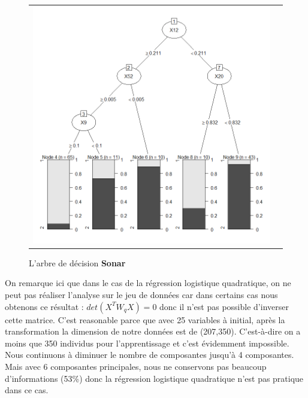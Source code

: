 \documentclass[a4paper,11pt,oneside,roman]{article}
\begin{document}
\begin{figure}[htb]
    \centering
    \begin{tabular}{cc}
    \includegraphics[scale = .4]{./discrimination/Sonar/tree_plot.png} &
    \end{tabular}
    \caption{L'arbre de décision \textbf{Sonar}}
    \label{fig:my_label}
\end{figure}
On remarque ici que dans le cas de la régression logistique quadratique, on ne peut pas réaliser l'analyse sur le jeu de données car dans certains cas nous obtenons ce résultat : $det(X^{T}W_{q}X) =  0$ donc il n'est pas possible d'inverser cette matrice. C'est reasonable parce que avec 25 variables à initial, après la transformation la dimension de notre données est de (207,350). C'est-à-dire on a moins que 350 individus pour l'apprentissage et c'est évidemment impossible. Nous continuons à diminuer le nombre de composantes jusqu'à 4 composantes. Mais avec 6 composantes principales, nous ne conservons pas beaucoup d'informations (53\%) donc la régression logistique quadratique n'est pas pratique dans ce cas. 
\newline
\end{document}
